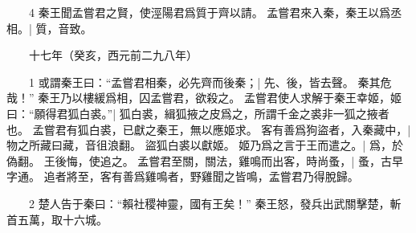 　　4 秦王聞孟嘗君之賢，使涇陽君爲質于齊以請。
	孟嘗君來入秦，秦王以爲丞相。|{
	質，音致。
}

　　十七年（癸亥，西元前二九八年）

　　1 或謂秦王曰：“孟嘗君相秦，必先齊而後秦；|{
	先、後，皆去聲。
}
秦其危哉！”
秦王乃以樓緩爲相，囚孟嘗君，欲殺之。
	孟嘗君使人求解于秦王幸姬，姬曰：“願得君狐白裘。”|{
	狐白裘，緝狐掖之皮爲之，所謂千金之裘非一狐之掖者也。
}
孟嘗君有狐白裘，已獻之秦王，無以應姬求。
	客有善爲狗盜者，入秦藏中，|{
	物之所藏曰藏，音徂浪翻。
}
盜狐白裘以獻姬。
	姬乃爲之言于王而遣之。|{
	爲，於偽翻。
}
王後悔，使追之。
	孟嘗君至關，關法，雞鳴而出客，時尚蚤，|{
	蚤，古早字通。
}
追者將至，客有善爲雞鳴者，野雞聞之皆鳴，孟嘗君乃得脫歸。


　　2 楚人告于秦曰：“賴社稷神靈，國有王矣！”
秦王怒，發兵出武關擊楚，斬首五萬，取十六城。


